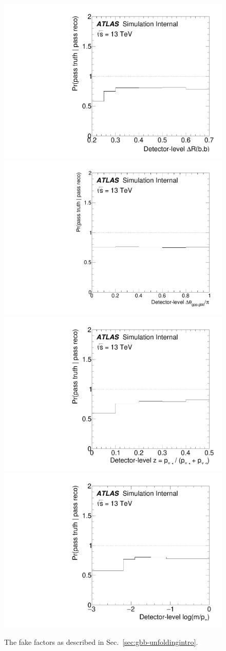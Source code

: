 \begin{figure}[htpb!]
\begin{center}
  \includegraphics[width=0.23\linewidth]{figures/gbb/Unfolding/dR_fake_factor.pdf}
  \includegraphics[width=0.23\linewidth]{figures/gbb/Unfolding/dphi_fake_factor.pdf}
  \includegraphics[width=0.23\linewidth]{figures/gbb/Unfolding/ZpT_fake_factor.pdf}
  \includegraphics[width=0.23\linewidth]{figures/gbb/Unfolding/fracmasspt_fake_factor.pdf}
\caption[]{The fake factors as described in Sec.~\ref{sec:gbb-unfoldingintro}.} 
\label{fig:gbb-fake}
\end{center}
\end{figure}

